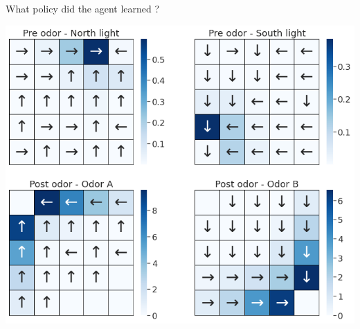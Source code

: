 \documentclass[bigger]{beamer}
\begin{document}
\begin{frame}[label={sec:org0817695}]{What policy did the agent learned ?}
\begin{center}
\includegraphics[height=0.9\textheight]{img/policy-allo-joint-repr.png}
\end{center}
\end{frame}
\end{document}
